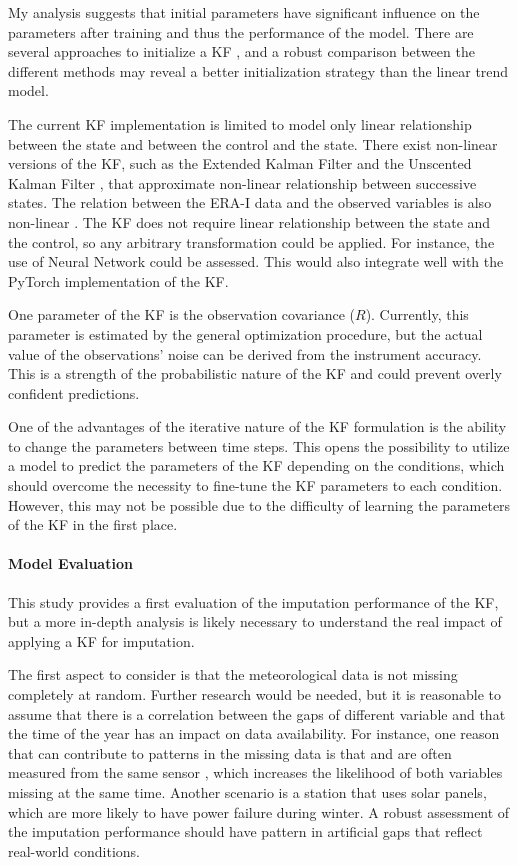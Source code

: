 \documentclass{article}
\begin{document}
My analysis suggests that initial parameters have significant influence on the parameters after training and thus the performance of the model. There are several approaches to initialize a KF \cite{durbin_time_2012}, and a robust comparison between the different methods may reveal a better initialization strategy than the linear trend model.  

The current KF implementation is limited to model only linear relationship between the state and between the control and the state. There exist non-linear versions of the KF, such as the Extended Kalman Filter and the Unscented Kalman Filter \cite{dan_simon_optimal_2006}, that approximate non-linear relationship between successive states.
The relation between the ERA-I data and the observed variables is also non-linear \cite{vuichard_filling_2015}. The KF does not require linear relationship between the state and the control, so any arbitrary transformation could be applied. For instance, the use of Neural Network could be assessed. This would also integrate well with the \textsf{PyTorch} implementation of the KF.

One parameter of the KF is the observation covariance ($R$). Currently, this parameter is estimated by the general optimization procedure, but the actual value of the observations' noise can be derived from the instrument accuracy. This is a strength of the probabilistic nature of the KF and could prevent overly confident predictions. 

One of the advantages of the iterative nature of the KF formulation is the ability to change the parameters between time steps.
This opens the possibility to utilize a model to predict the parameters of the KF depending on the conditions, which should overcome the necessity to fine-tune the KF parameters to each condition.
However, this may not be possible due to the difficulty of learning the parameters of the KF in the first place.

\paragraph{Model Evaluation} This study provides a first evaluation of the imputation performance of the KF, but a more in-depth analysis is likely necessary to understand the real impact of applying a KF for imputation.

The first aspect to consider is that the meteorological data is not missing completely at random. Further research would be needed, but it is reasonable to assume that there is a correlation between the gaps of different variable and that the time of the year has an impact on data availability. For instance, one reason that can contribute to patterns in the missing data is that  and  are often measured from the same sensor \cite{noauthor_associated_2020, noauthor_specification_nodate}, which increases the likelihood of both variables missing at the same time. Another scenario is a station that uses solar panels, which are more likely to have power failure during winter. A robust assessment of the imputation performance should have pattern in artificial gaps that reflect real-world conditions.
\end{document}
